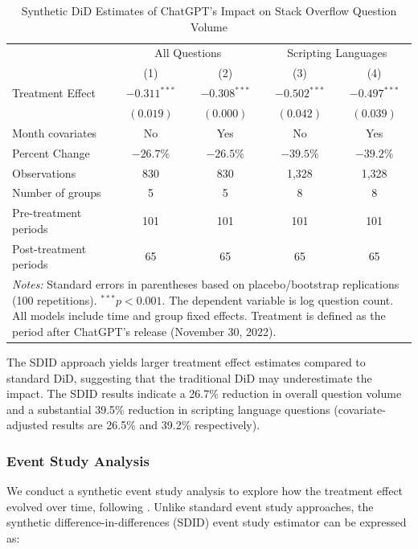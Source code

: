 \begin{table}[H]
    \centering
    \caption{Synthetic DiD Estimates of ChatGPT's Impact on Stack Overflow Question Volume}
    \label{tab:sdid_results}
    \begin{tabular}{lcccc}
        \toprule
            & \multicolumn{2}{c}{All Questions} & \multicolumn{2}{c}{Scripting Languages} \\
            \cmidrule(lr){2-3} \cmidrule(lr){4-5}
            & (1) & (2) & (3) & (4) \\
        \midrule
            Treatment Effect & $-0.311^{***}$ & $-0.308^{***}$ & $-0.502^{***}$ & $-0.497^{***}$ \\
            & $(0.019)$ & $(0.000)$ & $(0.042)$ & $(0.039)$ \\
        \midrule
            Month covariates & No & Yes & No & Yes \\
            Percent Change & $-26.7\%$ & $-26.5\%$ & $-39.5\%$ & $-39.2\%$ \\
        \midrule
            Observations & 830 & 830 & 1,328 & 1,328 \\
            Number of groups & 5 & 5 & 8 & 8 \\
            Pre-treatment periods & 101 & 101 & 101 & 101 \\
            Post-treatment periods & 65 & 65 & 65 & 65 \\
        \bottomrule
            \multicolumn{5}{p{0.95\linewidth}}{\footnotesize \textit{Notes:} Standard errors in parentheses based on placebo/bootstrap replications (100 repetitions). $^{***}p<0.001$. The dependent variable is log question count. All models include time and group fixed effects. Treatment is defined as the period after ChatGPT's release (November 30, 2022).} \\
    \end{tabular}
\end{table}

The SDID approach yields larger treatment effect estimates compared to standard DiD, suggesting that the traditional DiD may underestimate the impact. The SDID results indicate a 26.7\% reduction in overall question volume and a substantial 39.5\% reduction in scripting language questions (covariate-adjusted results are 26.5\% and 39.2\% respectively).


\subsubsection{Event Study Analysis}
We conduct a synthetic event study analysis to explore how the treatment effect evolved over time, following \textcite{ciccia_short_2024}. Unlike standard event study approaches, the synthetic difference-in-differences (SDID) event study estimator can be expressed as:

